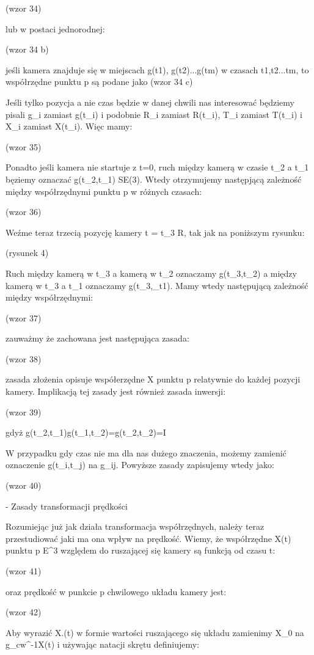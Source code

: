 (wzor 34)

lub w postaci jednorodnej:

(wzor 34 b)

jeśli kamera znajduje się w miejscach g(t1), g(t2)...g(tm) w czasach t1,t2...tm, to współrzędne punktu p są podane jako (wzor 34 c)

Jeśli tylko pozycja a nie czas będzie w danej chwili nas interesować będziemy pisali g_i zamiast g(t_i) i podobnie R_i zamiast R(t_i), T_i zamiast T(t_i) i X_i zamiast X(t_i). Więc mamy:

(wzor 35)

Ponadto jeśli kamera nie startuje z t=0, ruch między kamerą w czasie t_2 a t_1 bęziemy oznaczać g(t_2,t_1) \in SE(3). Wtedy otrzymujemy następjącą zależność między współrzędnymi punktu p w różnych czasach:

(wzor 36)

Weźme teraz trzecią pozycję kamery t = t_3 \in R, tak jak na poniższym rysunku:

(rysunek 4)

Ruch między kamerą w t_3 a kamerą w t_2 oznaczamy g(t_3,t_2) a między kamerą w t_3 a t_1 oznaczamy g(t_3,_t1). Mamy wtedy następującą zależność między współrzędnymi:

(wzor 37)

zauważmy że zachowana jest następująca zasada:

(wzor 38)

zasada złożenia opisuje współerzędne X punktu p relatywnie do każdej pozycji kamery. Implikacją tej zasady jest również zasada inwersji:

(wzor 39)

gdyż g(t_2,t_1)g(t_1,t_2)=g(t_2,t_2)=I

W przypadku gdy czas nie ma dla nas dużego znaczenia, możemy zamienić oznaczenie g(t_i,t_j) na g_ij. Powyższe zasady zapisujemy wtedy jako:

(wzor 40)

- Zasady transformacji prędkości

Rozumiejąc już jak działa transformacja współrzędnych, należy teraz przestudiować jaki ma ona wpływ na prędkość. Wiemy, że współrzędne X(t) punktu p \in E^3 względem do ruszającej się kamery są funkcją od czasu t:

(wzor 41)

oraz prędkość w punkcie p chwilowego układu kamery jest:

(wzor 42)

Aby wyrazić X.(t) w formie wartości ruszającego się układu zamienimy X_0 na g_cw^-1X(t) i używając natacji skrętu definiujemy:

